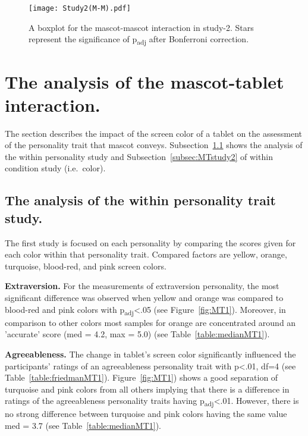 \begin{figure}[hbt!]
    \centering
    \texttt{[image: Study2(M-M).pdf]}
    \caption[]{A boxplot for the mascot-mascot interaction in study-2.
    Stars represent the significance of p\textsubscript{adj} after Bonferroni correction.\footnotemark}
    \label{fig:MM2}
\end{figure}
\section{The analysis of the mascot-tablet interaction.}
\label{sec:m-t}
The section describes the impact of the screen color of a tablet on the assessment of the
personality trait that mascot conveys.
Subsection~\ref{subsec:MTstudy1} shows the analysis of the within personality study
and Subsection~\ref{subsec:MTstudy2} of within condition study (i.e.\ color).

\subsection{The analysis of the within personality trait study.}
\label{subsec:MTstudy1}
The first study is focused on each personality by comparing the scores given
for each color within that personality trait.
Compared factors are yellow, orange, turquoise, blood-red, and pink screen colors.

\par\textbf{Extraversion.}
For the measurements of extraversion personality,
the most significant difference was observed when yellow and orange was compared to
blood-red and pink colors with p\textsubscript{adj}<.05 (see Figure~\ref{fig:MT1}).
Moreover, in comparison to other colors most samples for orange are concentrated around
an 'accurate' score (med = 4.2, max = 5.0) (see Table~\ref{table:medianMT1}).

\par\textbf{Agreeableness.}
The change in tablet's screen color significantly influenced the participants' ratings of
an agreeableness personality trait with p<.01, df=4 (see Table~\ref{table:friedmanMT1}).
Figure~\ref{fig:MT1}) shows a good separation of turquoise and pink colors
from all others implying that there is a difference in ratings of the
agreeableness personality traits having p\textsubscript{adj}<.01.
However, there is no strong difference between turquoise and pink colors having
the same value med = 3.7 (see Table~\ref{table:medianMT1}).

